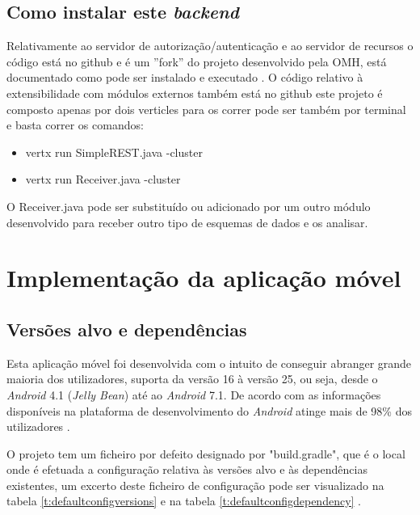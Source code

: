 \subsection{Como instalar este \textit{backend}}
Relativamente ao servidor de autorização/autenticação e ao servidor de recursos o código está no github \cite{omh-code} e é um ''fork'' do projeto desenvolvido pela \gls{OMH}, está documentado como pode ser instalado e executado \cite{omh-runnatively}.
O código relativo à extensibilidade com módulos externos também está no github\cite{restpubsub} este projeto é composto apenas por dois verticles para os correr pode ser também por terminal e basta correr os comandos:
\begin{itemize}
    \item vertx run SimpleREST.java -cluster
    \item vertx run Receiver.java -cluster
\end{itemize}
O Receiver.java pode ser substituído ou adicionado por um outro módulo desenvolvido para receber outro tipo de esquemas de dados e os analisar.

\section{Implementação da aplicação móvel}
\subsection{Versões alvo e dependências}
Esta aplicação móvel foi desenvolvida com o intuito de conseguir abranger grande maioria dos utilizadores, suporta da versão 16 à versão 25, ou seja,  desde o \textit{Android} 4.1 (\textit{Jelly Bean}) até ao \textit{Android} 7.1. De acordo com as informações disponíveis na plataforma de desenvolvimento do \textit{Android} atinge mais de 98\% dos utilizadores \cite{android-versions}.

O projeto tem um ficheiro por defeito designado por "build.gradle", que é o local onde é efetuada a configuração relativa às versões alvo e às dependências existentes, um excerto deste ficheiro de configuração pode ser visualizado na tabela \ref{t:defaultconfigversions} e na tabela \ref{t:defaultconfigdependency} .


